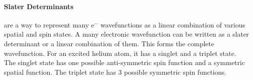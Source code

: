 \documentclass[11pt]{article}
\begin{document}
\paragraph{Slater Determinants}
are a way to represent many e$^-$ wavefunctions as a linear combination of various spatial and spin states. A many electronic wavefunction can be written as a slater determinant or a linear combination of them. This forms the complete wavefunction. 
For an excited helium atom, it has a singlet and a triplet state. The singlet state has one possible anti-symmetric spin function and a symmetric spatial function. The triplet state has 3 possible symmetric spin functions. 
\end{document}
